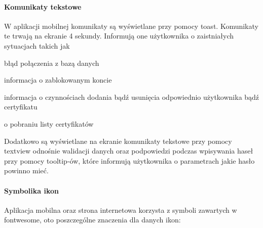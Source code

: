 		\paragraph*{Komunikaty tekstowe}
			 W aplikacji mobilnej komunikaty są wyświetlane przy pomocy toast. Komunikaty te  trwają na ekranie 4 sekundy. Informują one użytkownika o zaistniałych sytuacjach takich jak
			 \begin{itemize*}
			 	\item błąd połączenia z bazą danych
			 	\item informacja o zablokowanym koncie 
			 	\item informacja o czynnościach dodania bądź usunięcia odpowiednio użytkownika bądź certyfikatu
			 	\item o pobraniu listy certyfikatów
			 \end{itemize*}
		 
		 Dodatkowo są wyświetlane na ekranie komunikaty tekstowe przy pomocy  textview odnośnie walidacji danych oraz podpowiedzi podczas wpisywania haseł przy pomocy tooltip-ów, które informują użytkownika o parametrach jakie hasło powinno mieć.
		 
		\paragraph*{Symbolika ikon}\label{Symbolika ikon}
		Aplikacja mobilna oraz strona internetowa korzysta z symboli zawartych w fontwesome, oto poszczególne znaczenia dla danych ikon:
	  
